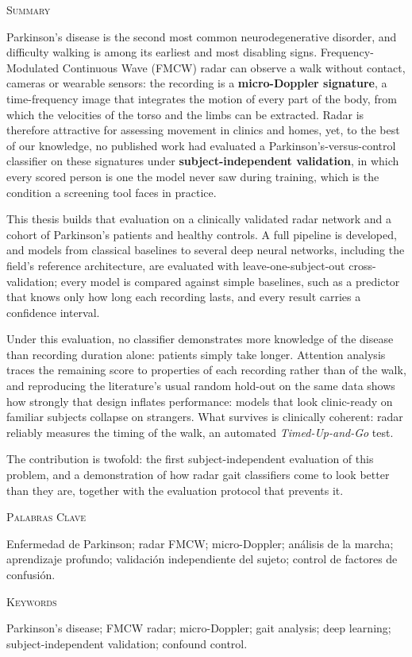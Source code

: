 \Large{\textsc{\textcolor{nar}{Summary}}} \par
\vspace{0.2cm}
\normalsize{%
Parkinson's disease is the second most common neurodegenerative disorder,
and difficulty walking is among its earliest and most disabling signs.
Frequency-Modulated Continuous Wave (FMCW) radar can observe a walk without
contact, cameras or wearable sensors: the recording is a
\textbf{micro-Doppler signature}, a time-frequency image that integrates the
motion of every part of the body, from which the velocities of the torso and
the limbs can be extracted. Radar is therefore attractive for assessing
movement in clinics and homes, yet, to the best of our knowledge, no
published work had evaluated a Parkinson's-versus-control classifier on
these signatures under \textbf{subject-independent validation}, in which
every scored person is one the model never saw during training, which is the
condition a screening tool faces in practice.

This thesis builds that evaluation on a clinically validated radar network
and a cohort of Parkinson's patients and healthy controls. A full pipeline
is developed, and models from classical baselines to several deep neural
networks, including the field's reference architecture, are evaluated with
leave-one-subject-out cross-validation; every model is compared against
simple baselines, such as a predictor that knows only how long each
recording lasts, and every result carries a confidence interval.

Under this evaluation, no classifier demonstrates more knowledge of the
disease than recording duration alone: patients simply take longer.
Attention analysis traces the remaining score to properties of each
recording rather than of the walk, and reproducing the literature's usual
random hold-out on the same data shows how strongly that design inflates
performance: models that look clinic-ready on familiar subjects collapse on
strangers. What survives is clinically coherent: radar reliably measures
the timing of the walk, an automated \textit{Timed-Up-and-Go} test.

The contribution is twofold: the first subject-independent evaluation of
this problem, and a demonstration of how radar gait classifiers come to
look better than they are, together with the evaluation protocol that
prevents it.}
\vspace{0.9cm}

\Large{\textsc{\textcolor{nar}{Palabras Clave}}} \par
\vspace{0.2cm}
\normalsize{Enfermedad de Parkinson; radar FMCW; micro-Doppler; análisis de la marcha;
aprendizaje profundo; validación independiente del sujeto; control de factores de confusión.} \par
\vspace{0.8cm}

\Large{\textsc{\textcolor{nar}{Keywords}}} \par
\vspace{0.2cm}
\normalsize{Parkinson's disease; FMCW radar; micro-Doppler; gait analysis;
deep learning; subject-independent validation; confound control.} \par
